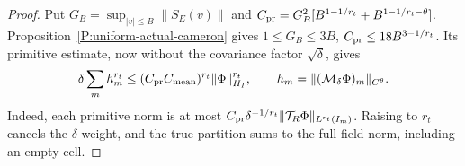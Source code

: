 \begin{proof}
  Put $G_B=\sup_{|v|\le B}\|S_E(v)\|$ and
  $C_{\rm pr}=G_B^2[B^{1-1/r_t}+B^{1-1/r_t-\theta}]$.
  Proposition~\ref{P:uniform-actual-cameron} gives
  $1\le G_B\le3B$, $C_{\rm pr}\le18B^{3-1/r_t}$.
  Its primitive estimate, now without the covariance factor
  $\sqrt\delta$, gives
  \begin{equation}\label{E:tube-primitive-sum}
    \delta\sum_m h_m^{r_t}
    \le(C_{\rm pr}C_{\rm mean})^{r_t}\|\Phi\|_{H_I}^{r_t},
    \qquad h_m=\|(\mathcal M_\delta\Phi)_m\|_{C^\theta}.
  \end{equation}
  Indeed, each primitive norm is at most
  $C_{\rm pr}\delta^{-1/r_t}
  \|\mathcal T_R\Phi\|_{L^{r_t}(I_m)}$.
  Raising to $r_t$ cancels the $\delta$ weight, and the true
  partition sums to the full field norm, including an empty cell.


\end{proof}
